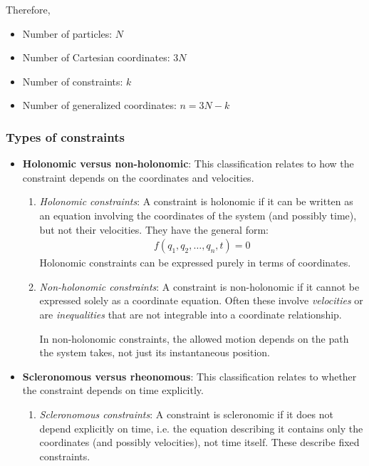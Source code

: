 Therefore,
\begin{itemize}
	\item Number of particles: $N$
	\item Number of Cartesian coordinates: $3N$
	\item Number of constraints: $k$
	\item Number of generalized coordinates: $n=3N-k$
\end{itemize}

\subsubsection{Types of constraints}
\begin{itemize}
	\item \textbf{Holonomic versus non-holonomic}: This classification relates to how the constraint depends on the coordinates and velocities.
	\begin{enumerate}
		\item \textit{Holonomic constraints}: A constraint is holonomic if it can be written as an equation involving the coordinates of the system (and possibly time), but not their velocities. They have the general form:
		\begin{align*}
			f(q_1,q_2,\dots,q_n,t)=0
		\end{align*}
		Holonomic constraints can be expressed purely in terms of coordinates.
		
		\item \textit{Non-holonomic constraints}: A constraint is non-holonomic if it cannot be expressed solely as a coordinate equation. Often these involve \textit{velocities} or are \textit{inequalities} that are not integrable into a coordinate relationship.
		
		In non-holonomic constraints, the allowed motion depends on the path the system takes, not just its instantaneous position.
	\end{enumerate}
	
	\item \textbf{Scleronomous versus rheonomous}: This classification relates to whether the constraint depends on time explicitly.
	\begin{enumerate}
		\item \textit{Scleronomous constraints}: A constraint is scleronomic if it does not depend explicitly on time, i.e. the equation describing it contains only the coordinates (and possibly velocities), not time itself. These describe fixed constraints.
		

\end{enumerate}
\end{itemize}
